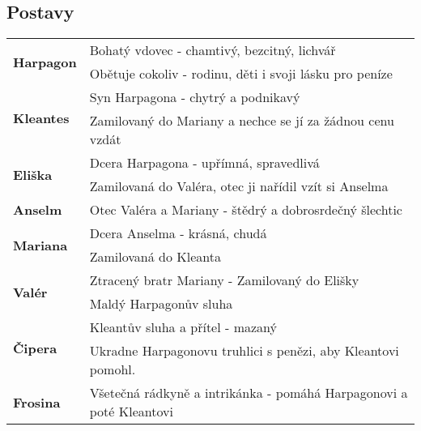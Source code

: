 \subsection*{Postavy}
\begin{tabularx}{\linewidth}{l|l}
    \multirow{2}{15em}{\textbf{Harpagon}} & Bohatý vdovec - chamtivý, bezcitný, lichvář                         \\
                                          & Obětuje cokoliv - rodinu, děti i svoji lásku pro peníze             \\
    \hline
    \multirow{2}{15em}{\textbf{Kleantes}} & Syn Harpagona - chytrý a podnikavý                                  \\
                                          & Zamilovaný do Mariany a nechce se jí za žádnou cenu vzdát           \\
    \hline
    \multirow{2}{15em}{\textbf{Eliška}}   & Dcera Harpagona - upřímná, spravedlivá                              \\
                                          & Zamilovaná do Valéra, otec ji nařídil vzít si Anselma               \\
    \hline
    \textbf{Anselm}                       & Otec Valéra a Mariany - štědrý a dobrosrdečný šlechtic              \\
    \hline
    \multirow{2}{15em}{\textbf{Mariana}}  & Dcera Anselma - krásná, chudá                                       \\
                                          & Zamilovaná do Kleanta                                               \\
    \hline
    \multirow{2}{15em}{\textbf{Valér}}    & Ztracený bratr Mariany - Zamilovaný do Elišky                       \\
                                          & Maldý Harpagonův sluha                                              \\
    \hline
    \multirow{2}{15em}{\textbf{Čipera}}   & Kleantův sluha a přítel - mazaný                                    \\
                                          & Ukradne Harpagonovu truhlici s penězi, aby Kleantovi pomohl.        \\
    \hline
    \textbf{Frosina}                      & Všetečná rádkyně a intrikánka - pomáhá Harpagonovi a poté Kleantovi \\
\end{tabularx}
